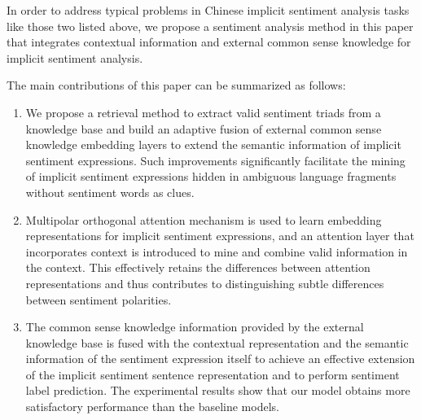 In order to address typical problems in Chinese implicit sentiment analysis tasks like those two listed above, we propose a sentiment analysis method in this paper that integrates contextual information and external common sense knowledge for implicit sentiment analysis.

The main contributions of this paper can be summarized as follows:

\begin{enumerate}

\item We propose a retrieval method to extract valid sentiment triads from a knowledge base and build an adaptive fusion of external common sense knowledge embedding layers to extend the semantic information of implicit sentiment expressions. Such improvements significantly facilitate the mining of implicit sentiment expressions hidden in ambiguous language fragments without sentiment words as clues.

\item Multipolar orthogonal attention mechanism is used to learn embedding representations for implicit sentiment expressions, and an attention layer that incorporates context is introduced to mine and combine valid information in the context. This effectively retains the differences between attention representations and thus contributes to distinguishing subtle differences between sentiment polarities.

\item The common sense knowledge information provided by the external knowledge base is fused with the contextual representation and the semantic information of the sentiment expression itself to achieve an effective extension of the implicit sentiment sentence representation and to perform sentiment label prediction. The experimental results show that our model obtains more satisfactory performance than the baseline models.

\end{enumerate} 